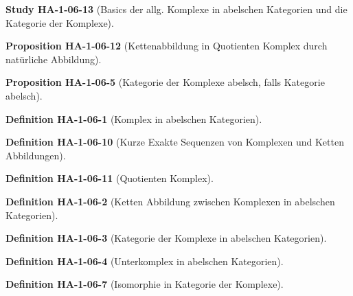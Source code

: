 \documentclass[10pt, letterpaper]{article}
\newcommand{\CustomHeading}[3]{%
  \par\medskip\noindent%
  \textbf{#1 #2} \textnormal{(#3)}.\enskip%
}
\newenvironment{DEF}[2]{\CustomHeading{Definition}{#1}{#2}}{}
\newenvironment{PROP}[2]{\CustomHeading{Proposition}{#1}{#2}}{}
\newenvironment{STUD}[2]{\CustomHeading{Study}{#1}{#2}}{}
\begin{document}
\begin{STUD}{HA-1-06-13}{Basics der allg. Komplexe in abelschen Kategorien und die Kategorie der Komplexe}

\end{STUD}





\begin{PROP}{HA-1-06-12}{Kettenabbildung in Quotienten Komplex durch natürliche Abbildung}

\end{PROP}

\begin{PROP}{HA-1-06-5}{Kategorie der Komplexe abelsch, falls Kategorie abelsch}

\end{PROP}







\begin{DEF}{HA-1-06-1}{Komplex in abelschen Kategorien}

\end{DEF}

\begin{DEF}{HA-1-06-10}{Kurze Exakte Sequenzen von Komplexen und Ketten Abbildungen}

\end{DEF}

\begin{DEF}{HA-1-06-11}{Quotienten Komplex}

\end{DEF}

\begin{DEF}{HA-1-06-2}{Ketten Abbildung zwischen Komplexen in abelschen Kategorien}

\end{DEF}

\begin{DEF}{HA-1-06-3}{Kategorie der Komplexe in abelschen Kategorien}

\end{DEF}

\begin{DEF}{HA-1-06-4}{Unterkomplex in abelschen Kategorien}

\end{DEF}

\begin{DEF}{HA-1-06-7}{Isomorphie in Kategorie der Komplexe}

\end{DEF}
\end{document}
